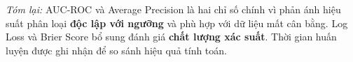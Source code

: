 \textit{Tóm lại:} AUC-ROC và Average Precision là hai chỉ số chính
vì phản ánh hiệu suất phân loại \textbf{độc lập với ngưỡng}
và phù hợp với dữ liệu mất cân bằng.
Log Loss và Brier Score bổ sung đánh giá \textbf{chất lượng xác suất}.
Thời gian huấn luyện được ghi nhận để so sánh hiệu quả tính toán.

